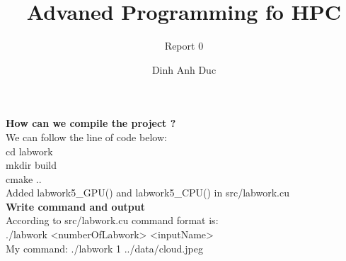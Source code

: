 \documentclass[10pt, a4paper]{article}
\title{Advaned Programming fo HPC}
\subtitle{Report 0}
\author{Dinh Anh Duc}
\begin{document}
\maketitle

\textbf{How can we compile the project ?}
\\
We can follow the line of code below:
\\
cd labwork
\\
mkdir build
\\
cmake ..
\\
Added labwork5_GPU() and labwork5_CPU() in src/labwork.cu
\\
\textbf{Write command and output}
\\
According to src/labwork.cu command format is:
\\
./labwork <numberOfLabwork> <inputName>
\\
My command: ./labwork 1 ../data/cloud.jpeg
\end{document}

